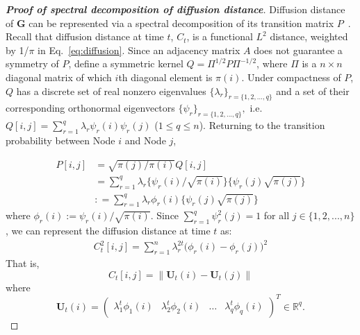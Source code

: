 \documentclass[12pt]{article}
\theoremstyle{definition}
\begin{document}
\begin{proof}[\textbf{Proof of spectral decomposition of diffusion distance}]
Diffusion distance of $\mathbf{G}$ can be represented via a spectral decomposition of its transition matrix $P$~\citep{coifman2006diffusion,lafon2006diffusion}. Recall that diffusion distance at time $t$, $C_{t}$, is a functional $L^2$ distance, weighted by 1/$\pi$ in Eq.~\ref{eq:diffusion}. Since an adjacency matrix $A$ does not guarantee a symmetry of $P$, define a symmetric kernel $Q = \Pi^{1/2} P \Pi^{-1/2}$, where $\Pi$ is a $n \times n$ diagonal matrix of which $i$th diagonal element is $\pi(i)$. Under compactness of $P$, $Q$ has a discrete set of real nonzero eigenvalues $\{ \lambda_{r} \}_{r = \{1,2,...,q \}}$ and a set of their corresponding orthonormal eigenvectors $\{ \psi_{r} \}_{r = \{1,2,..., q \} },$ i.e. $Q[i,j] = \sum\limits_{r=1}^{q} \lambda_{r} \psi_{r}(i) \psi_{r}(j)$ ($1 \leq q \leq n$). Returning to the transition probability between Node $i$ and Node $j$,

\begin{equation}
\begin{split}
P[i,j] &  = \sqrt{\pi(j) / \pi(i) } Q[i,j] \\ &   = \sum\limits_{r=1}^{q} \lambda_{r} \big\{ \psi_{r}(i) / \sqrt{\pi(i)}  \big\} \big\{ \psi_{r}(j) \sqrt{\pi(j)} \big\}  \\ & : = \sum\limits_{r=1}^{q} \lambda_{r} \phi_{r}(i) \big\{ \psi_{r}(j) \sqrt{\pi(j)} \big\}
\end{split}
\end{equation}
where $\phi_{r}(i) := \psi_{r}(i) / \sqrt{\pi(i)}$. Since $\sum\limits_{r=1}^{q} \psi^2_{r}(j) = 1$ for all $j \in \{1,2,...,n\}$, we can represent the diffusion distance at time $t$ as: 	
\begin{equation}
\begin{split}
C^2_{t}[i,j]  = \sum\limits_{r=1}^{n} \lambda^{2t}_{r} \big( \phi_{r} (i) - \phi_{r}(j)   \big)^2  
\end{split}
\end{equation}
That is,
\begin{equation}
C_{t}[i,j] = \parallel \mathbf{U}_{t}(i) - \mathbf{U}_{t}(j) \parallel
\end{equation}
where 
\begin{equation} 
\mathbf{U}_{t}(i) = \begin{pmatrix} \lambda^{t}_{1} \phi_{1}(i) & \lambda^{t}_{2} \phi_{2} (i)  & \ldots & \lambda^{t}_{q} \phi_{q}(i) \end{pmatrix}^{T} \in \mathbb{R}^{q}.
\end{equation}

\end{proof}	
	
\end{document}
